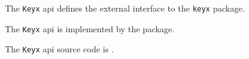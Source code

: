 
The {\tt Keyx} api defines the external interface to the {\tt keyx} package.

The {\tt Keyx} api is implemented by the  package.

The {\tt Keyx} api source code is .

